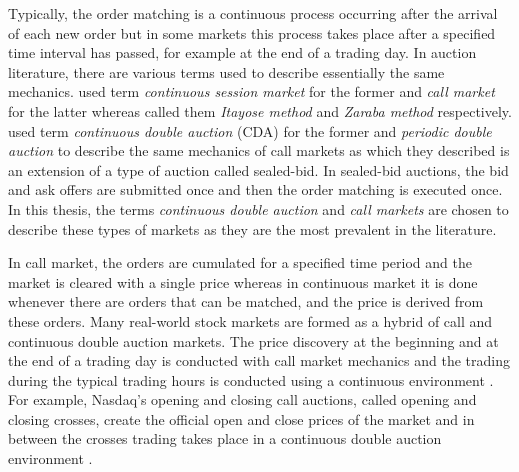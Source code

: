 Typically, the order matching 
is a continuous process occurring after the arrival of each new order but
in some markets this process takes place after a specified time interval
has passed, for example at the end of a trading day. \citep{boer05}
In auction literature, there are various terms used to describe essentially 
the same mechanics. \citet{boer05} used term 
\textit{continuous session market} for the former and \textit{call market}
for the latter whereas \citet{ASt05} called them \textit{Itayose method}
and \textit{Zaraba method} respectively. \citet{Moc15} used term \textit{continuous 
double auction} (CDA) for the former and \textit{periodic double auction} to describe 
the same mechanics of call markets as which they described is an extension of 
a type of auction called sealed-bid. In sealed-bid auctions, the bid and ask offers
are submitted once and then the order matching is executed once. In this thesis,
the terms \textit{continuous double auction} and \textit{call markets} are chosen to describe
these types of markets as they are the most prevalent in the literature.

In call market, the orders are cumulated for a specified time period and the
market is cleared with a single price whereas in continuous market it is done
whenever there are orders that can be matched, and the price is derived from these
orders. \citep{boer05} 
Many real-world stock markets are formed as a hybrid of call and continuous
double auction markets. The price discovery at the beginning and at the end of a 
trading day is conducted with call market mechanics and the trading during the 
typical trading hours is conducted using a continuous environment \citep{NasdaqClosing05}.
For example, Nasdaq's opening and closing call auctions, called opening and closing crosses,
create the official open and close prices of the market and in between the crosses 
trading takes place in a continuous double auction environment \citep{NasdaqCrosses}.  
 
